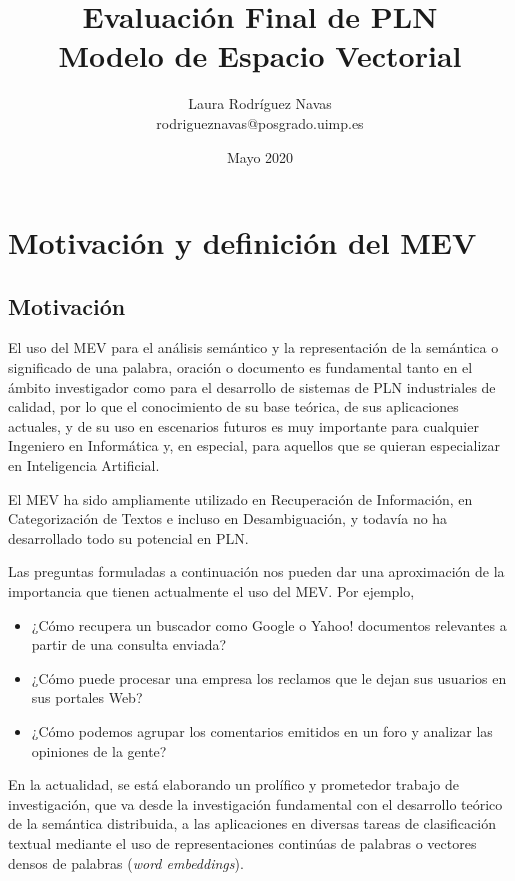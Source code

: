 \documentclass[titlepage]{article}
\title{Evaluación Final de PLN \\ Modelo de Espacio Vectorial}
\author{Laura Rodríguez Navas \\ rodrigueznavas@posgrado.uimp.es}
\date{Mayo 2020}
\begin{document}
\maketitle

\renewcommand{\contentsname}{Índice}
\tableofcontents

\newpage
\section{Motivación y definición del MEV}

\subsection{Motivación}

El uso del MEV para el análisis semántico y la representación de la semántica o significado de una palabra, oración o documento es fundamental tanto en el ámbito investigador como para el desarrollo de sistemas de PLN industriales de calidad, por lo que el conocimiento de su base teórica, de sus aplicaciones actuales, y de su uso en escenarios futuros es muy importante para cualquier Ingeniero en Informática y, en especial, para aquellos que se quieran especializar en Inteligencia Artificial.

El MEV ha sido ampliamente utilizado en Recuperación de Información, en Categorización de Textos e incluso en Desambiguación, y todavía no ha desarrollado todo su potencial en PLN. 

Las preguntas formuladas a continuación nos pueden dar una aproximación de la importancia que tienen actualmente el uso del MEV. Por ejemplo,

\begin{itemize}
	\item ¿Cómo recupera un buscador como Google o Yahoo! documentos relevantes a partir de una consulta enviada?
	\item ¿Cómo puede procesar una empresa los reclamos que le dejan sus usuarios en sus portales Web?
	\item 
	¿Cómo podemos agrupar los comentarios emitidos en un foro y analizar las opiniones de la gente?
\end{itemize}

En la actualidad, se está elaborando un prolífico y prometedor trabajo de investigación, que va desde la investigación fundamental con el desarrollo teórico de la semántica distribuida, a las aplicaciones en diversas tareas de clasificación textual mediante el uso de representaciones continúas de palabras o vectores densos de palabras (\textit{word embeddings}). 
\end{document}
